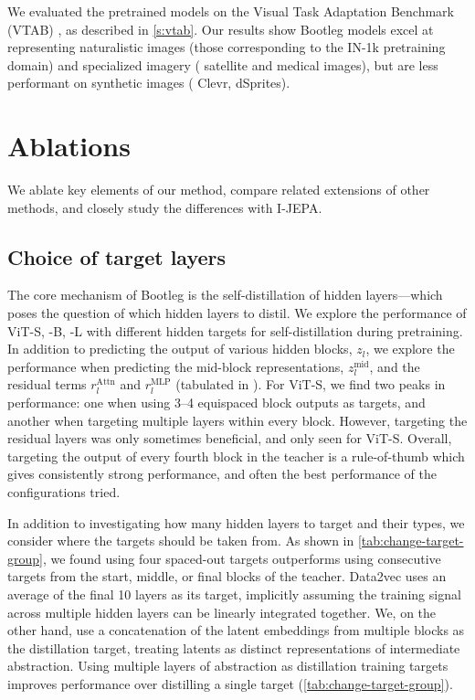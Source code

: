We evaluated the pretrained models on the Visual Task Adaptation Benchmark (VTAB) \citep{Zhai2019_VTAB}, as described in \cref{s:vtab}.
Our results show Bootleg models excel at representing naturalistic images (those corresponding to the IN-1k pretraining domain) and specialized imagery (\eg{} satellite and medical images), but are less performant on synthetic images (\eg{} Clevr, dSprites).


\section{Ablations}

We ablate key elements of our method, compare related extensions of other methods, and closely study the differences with I-JEPA.

\subsection{Choice of target layers}
\label{s:ablation:target}

The core mechanism of Bootleg is the self-distillation of hidden layers---which poses the question of which hidden layers to distil.
We explore the performance of ViT-S, -B, -L with different hidden targets for self-distillation during pretraining. %
In addition to predicting the output of various hidden blocks, $z_l$, we explore the performance when predicting the mid-block representations, $z_l^\text{mid}$, and the residual terms $r_l^\text{Attn}$ and $r_l^\text{MLP}$ (tabulated in \iftoggle{arxiv}{\cref{s:target-choice}}{supplementary materials}).
For ViT-S, we find two peaks in performance: one when using 3--4 equispaced block outputs as targets, and another when targeting multiple layers within every block.
However, targeting the residual layers was only sometimes beneficial, and only seen for ViT-S.
Overall, targeting the output of every fourth block in the teacher is a rule-of-thumb which gives consistently strong performance, and often the best performance of the configurations tried.

In addition to investigating how many hidden layers to target and their types, 
we consider where the targets should be taken from.
As shown in \cref{tab:change-target-group}, we found using four spaced-out targets outperforms using consecutive targets from the start, middle, or final blocks of the teacher.
Data2vec uses an average of the final 10 layers as its target, implicitly assuming the training signal across multiple hidden layers can be linearly integrated together.
We, on the other hand, use a concatenation of the latent embeddings from multiple blocks as the distillation target, treating latents as distinct representations of intermediate abstraction.
Using multiple layers of abstraction as distillation training targets improves performance over distilling a single target (\cref{tab:change-target-group}).

